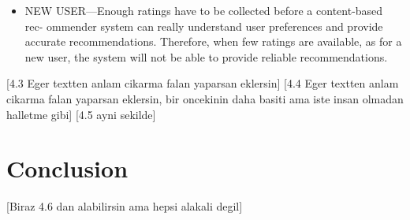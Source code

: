 \begin{itemize}
	\item NEW USER—Enough ratings have to be collected before a content-based rec- ommender system can really understand user preferences and provide accurate recommendations. Therefore, when few ratings are available, as for a new user, the system will not be able to provide reliable recommendations.
\end{itemize}

[4.3 Eger textten anlam cikarma falan yaparsan eklersin]
[4.4 Eger textten anlam cikarma falan yaparsan eklersin, bir oncekinin daha basiti ama iste insan olmadan halletme gibi]
[4.5 ayni sekilde]

\section{Conclusion}
[Biraz 4.6 dan alabilirsin ama hepsi alakali degil]



